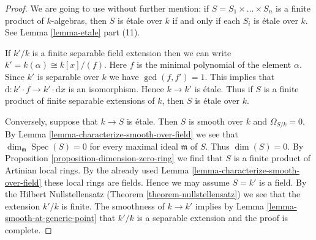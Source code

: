 \documentclass[10pt,a4paper]{amsart}
\theoremstyle{plain}
\theoremstyle{definition}
\theoremstyle{remark}
\numberwithin{equation}{subsection}
\def\Spec{\mathop{\mathrm{Spec}}}
\begin{document}
\begin{proof}
We are going to use without further mention: if
$S = S_1 \times \ldots \times S_n$ is a finite product
of $k$-algebras, then $S$ is \'etale over $k$ if and only
if each $S_i$ is \'etale over $k$. See Lemma \ref{lemma-etale} part (11).

\medskip\noindent
If $k'/k$ is a finite separable field extension then we can
write $k' = k(\alpha) \cong k[x]/(f)$. Here $f$ is the minimal
polynomial of the element $\alpha$. Since $k'$ is separable over $k$
we have $\gcd(f, f') = 1$. This
implies that $\text{d} : k'\cdot f \to k' \cdot \text{d}x$
is an isomorphism. Hence $k \to k'$ is \'etale. Thus if $S$
is a finite product of finite separable extensions of $k$, then
$S$ is \'etale over $k$.

\medskip\noindent
Conversely, suppose that $k \to S$ is \'etale. Then $S$ is smooth
over $k$ and $\Omega_{S/k} = 0$. By
Lemma \ref{lemma-characterize-smooth-over-field}
we see that $\dim_\mathfrak m \Spec(S) = 0$ for every
maximal ideal $\mathfrak m$ of $S$. Thus $\dim(S) = 0$. By
Proposition \ref{proposition-dimension-zero-ring}
we find that $S$ is a finite product of Artinian local rings.
By the already used
Lemma \ref{lemma-characterize-smooth-over-field}
these local rings are fields. Hence we may assume $S = k'$ is a field.
By the Hilbert Nullstellensatz (Theorem \ref{theorem-nullstellensatz})
we see that the extension $k'/k$ is finite. The smoothness
of $k \to k'$ implies by Lemma \ref{lemma-smooth-at-generic-point}
that $k'/k$ is a separable extension and
the proof is complete.
\end{proof}
\end{document}
